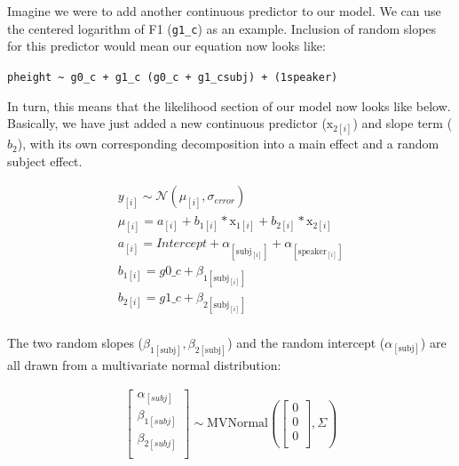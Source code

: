 \documentclass[
]{book}
\begin{document}
Imagine we were to add another continuous predictor to our model. We can use the centered logarithm of F1 (\texttt{g1\_c}) as an example. Inclusion of random slopes for this predictor would mean our equation now looks like:

\texttt{pheight\ \textasciitilde{}\ g0\_c\ +\ g1\_c\ (g0\_c\ +\ g1\_c\textbar{}subj)\ +\ (1\textbar{}speaker)}

In turn, this means that the likelihood section of our model now looks like below. Basically, we have just added a new continuous predictor (\(\mathrm{x}_{2[i]}\)) and slope term (\(b_{2}\)), with its own corresponding decomposition into a main effect and a random subject effect.

\begin{equation}
\begin{split}
y_{[i]} \sim \mathcal{N}(\mu_{[i]},\sigma_{error}) \\
\mu_{[i]} = a_{[i]} + b_{1[i]} * \mathrm{x}_{1[i]} + b_{2[i]} * \mathrm{x}_{2[i]}  \\ 
a_{[i]} = Intercept + \alpha_{[\mathrm{subj}_{[i]}]} + \alpha_{[\mathrm{speaker}_{[i]}]}  \\
b_{1[i]} =  g0\_c + \beta_{1{[\mathrm{subj}_{[i]}]}} \\ 
b_{2[i]} =  g1\_c + \beta_{2{[\mathrm{subj}_{[i]}]}} \\ 
\end{split}
\label{eq:613}
\end{equation}

The two random slopes (\(\beta_{1{[\mathrm{subj}]}},\beta_{2{[\mathrm{subj}]}}\)) and the random intercept (\(\alpha_{[\mathrm{subj}]}\)) are all drawn from a multivariate normal distribution:

\begin{equation}
\begin{split}
\begin{bmatrix} \alpha_{[subj]} \\ \beta_{1[subj]} \\ \beta_{2[subj]} \\ \end{bmatrix}  
\sim \mathrm{MVNormal} ( \begin{bmatrix} 0 \\ 0 \\ 0 \\ \end{bmatrix}, \Sigma) \\ 
\end{split}
\label{eq:613}
\end{equation}
\end{document}
